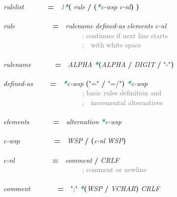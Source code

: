 \documentclass{article}
\begin{document}
{\scriptsize\ttfamily
\emph{rulelist}\mbox{\ \ \ \ \ \ \ }\textbf{=}\mbox{\ \ }\textcolor{teal}{\emph{1\textbf{*}}}\textbf{(} \emph{rule} \textbf{/} \textbf{(}\textcolor{teal}{\emph{\textbf{*}}}\emph{c{-}wsp} \emph{c{-}nl}\textbf{)} \textbf{)}\\
\\
\emph{rule}\mbox{\ \ \ \ \ \ \ \ \ \ \ }\textbf{=}\mbox{\ \ }\emph{rulename} \emph{defined{-}as} \emph{elements} \emph{c{-}nl}\\
\mbox{\ \ \ \ \ \ \ \ \ \ \ \ \ \ \ \ \ \ \ \ \ \ \ }\textcolor{gray}{; continues if next line starts}\\
\mbox{\ \ \ \ \ \ \ \ \ \ \ \ \ \ \ \ \ \ \ \ \ \ \ }\textcolor{gray}{;\mbox{\ \ }with white space}\\
\\
\emph{rulename}\mbox{\ \ \ \ \ \ \ }\textbf{=}\mbox{\ \ }\emph{ALPHA} \textcolor{teal}{\emph{\textbf{*}}}\textbf{(}\emph{ALPHA} \textbf{/} \emph{DIGIT} \textbf{/} \textcolor{BrickRed}{"{-}"}\textbf{)}\\
\\
\emph{defined{-}as}\mbox{\ \ \ \ \ }\textbf{=}\mbox{\ \ }\textcolor{teal}{\emph{\textbf{*}}}\emph{c{-}wsp} \textbf{(}\textcolor{BrickRed}{"="} \textbf{/} \textcolor{BrickRed}{"=/"}\textbf{)} \textcolor{teal}{\emph{\textbf{*}}}\emph{c{-}wsp}\\
\mbox{\ \ \ \ \ \ \ \ \ \ \ \ \ \ \ \ \ \ \ \ \ \ \ }\textcolor{gray}{; basic rules definition and}\\
\mbox{\ \ \ \ \ \ \ \ \ \ \ \ \ \ \ \ \ \ \ \ \ \ \ }\textcolor{gray}{;\mbox{\ \ }incremental alternatives}\\
\\
\emph{elements}\mbox{\ \ \ \ \ \ \ }\textbf{=}\mbox{\ \ }\emph{alternation} \textcolor{teal}{\emph{\textbf{*}}}\emph{c{-}wsp}\\
\\
\emph{c{-}wsp}\mbox{\ \ \ \ \ \ \ \ \ \ }\textbf{=}\mbox{\ \ }\emph{WSP} \textbf{/} \textbf{(}\emph{c{-}nl} \emph{WSP}\textbf{)}\\
\\
\emph{c{-}nl}\mbox{\ \ \ \ \ \ \ \ \ \ \ }\textbf{=}\mbox{\ \ }\emph{comment} \textbf{/} \emph{CRLF}\\
\mbox{\ \ \ \ \ \ \ \ \ \ \ \ \ \ \ \ \ \ \ \ \ \ \ }\textcolor{gray}{; comment or newline}\\
\\
\emph{comment}\mbox{\ \ \ \ \ \ \ \ }\textbf{=}\mbox{\ \ }\textcolor{BrickRed}{";"} \textcolor{teal}{\emph{\textbf{*}}}\textbf{(}\emph{WSP} \textbf{/} \emph{VCHAR}\textbf{)} \emph{CRLF}\\
}
\end{document}
